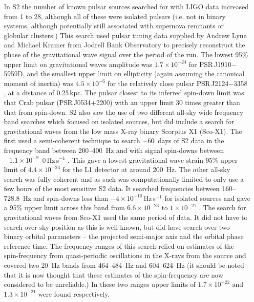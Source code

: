 \documentclass{article}
\begin{document}
In S2 the number of known pulsar sources searched for with LIGO data increased
from 1 to 28, although all of these were isolated pulsars (i.e. not in binary
systems, although potentially still associated with supernova remnants or
globular clusters.) This search used pulsar timing data supplied by Andrew Lyne
and Michael Kramer from Jodrell Bank Observatory to precisely reconstruct the
phase of the gravitational wave signal over the period of the run. The lowest
95\% upper limit on gravitational waves amplitude was $1.7\times10^{-24}$ for
PSR\,J1910$-$5959D, and the smallest upper limit on ellipticity (again assuming
the canonical moment of inertia) was $4.5\times10^{-6}$ for the relatively close
pulsar PSR\,J2124$-$3358 \cite{Abbott:2005f}, at a distance of 0.25\,kpc. The
pulsar closest to its inferred spin-down limit was that Crab pulsar
(PSR\,J0534+2200) with an upper limit 30 times greater than that from spin-down.
S2 also saw the use of two different all-sky wide frequency band searches which
focused on isolated sources, but did include a search for gravitational waves
from the low mass X-ray binary Scorpius X1 (Sco-X1). The first used a
semi-coherent technique to search $\sim60$~days of S2 data in the frequency band
between 200--400~Hz and with signal spin-downs between
$-1.1\times10^{-9}$--0\,Hz\,s$^{-1}$ \cite{Abbott:2005g}. This gave a lowest
gravitational wave strain 95\% upper limit of $4.4\times10^{-23}$ for the L1
detector at around 200~Hz. The other all-sky search was fully coherent and as
such was computationally limited to only use a few hours of the most sensitive
S2 data. It searched frequencies between 160--728.8~Hz and spin-downs less than
$-4\times10^{-10}$\,Hz\,s$^{-1}$ for isolated sources and gave a 95\% upper
limit across this band from $6.6\times10^{-23}$ to $1\times10^{-21}$
\cite{Abbott:2007a}. The search for gravitational waves from Sco-X1 used the
same period of data. It did not have to search over sky position as this is well
known, but did have search over two binary orbital parameters -- the projected
semi-major axis and the orbital phase reference time. The frequency ranges of
this search relied on estimates of the spin-frequency from quasi-periodic
oscillations in the X-rays from the source and covered two 20~Hz bands from
464--484~Hz and 604--624~Hz (it should be noted that it is now thought that
these estimates of the spin-frequency are now considered to be unreliable.) In
these two ranges upper limits of $1.7\times10^{-22}$ and $1.3\times10^{-21}$
were found respectively.
\end{document}
